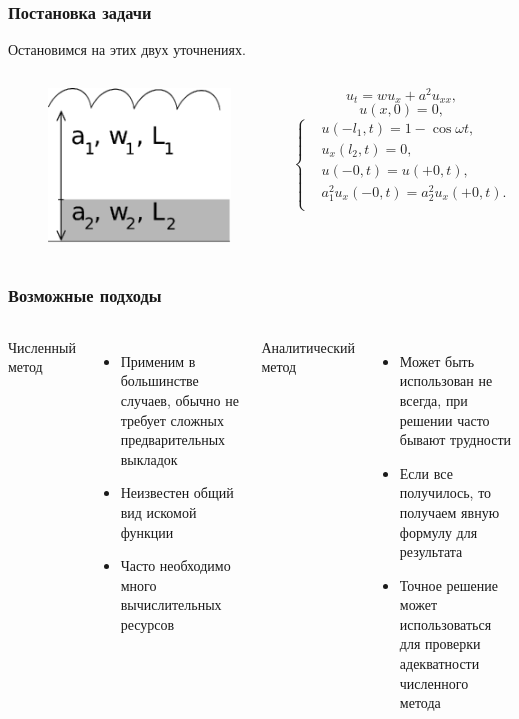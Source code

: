 \documentclass[10pt,pdf,hyperref={unicode}]{beamer}
\begin{document}
\begin{frame}
  \frametitle{Постановка задачи}
  Остановимся на этих двух уточнениях.
  \begin{columns}
  \begin{figure}[ht]
    \begin{center}
      \includegraphics[width=5cm]{int4.eps}
    \end{center}
  \end{figure}
  \begin{equation*}
   u_t = wu_x + a^2 u_{xx},
  \end{equation*}
  \begin{equation*}
   u(x,0) = 0,
  \end{equation*}
  \begin{equation*}
    \left\{
    \begin{aligned}
      & u(-l_1,t) = 1 - \cos \omega t, \\
      & u_x(l_2,t) = 0, \\
      & u(-0, t) = u(+0, t), \\
      & a_1^2 u_{x}(-0, t) = a_2^2 u_{x}(+0, t). \\
    \end{aligned}
    \right.
  \end{equation*}
  \end{columns}
\end{frame}

\begin{frame}
  \frametitle{Возможные подходы}
  \begin{columns}
    Численный метод
    \begin{itemize}
      \item Применим в большинстве случаев, обычно не требует сложных предварительных выкладок
      \item Неизвестен общий вид искомой функции
      \item Часто необходимо много вычислительных ресурсов
    \end{itemize}

    Аналитический метод
    \begin{itemize}
      \item Может быть использован не всегда, при решении часто бывают трудности
      \item Если все получилось, то получаем явную формулу для результата
      \item Точное решение может использоваться для проверки адекватности численного метода
    \end{itemize}
  \end{columns}
\end{frame}
\end{document}
